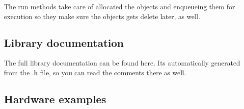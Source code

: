 The run methods take care of allocated the objects and enqueueing them for execution so they make sure the objects gets delete later, as well.

\subsection*{Library documentation}

The full library documentation can be found here. It\textquotesingle{}s automatically generated from the .h file, so you can read the comments there as well.

\subsection*{Hardware examples}